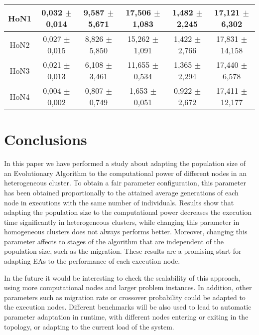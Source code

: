 \begin{table*}
\begin{tabular}{|c|c|c|c|c|c|}
HoN1	& 0,032	$\pm$ 0,014	& 9,587 $\pm$ 	5,671		& 17,506	$\pm$ 1,083		& 1,482	$\pm$ 2,245	&17,121  $\pm$ 	6,302 \\ \hline
HoN2	& 0,027	$\pm$ 0,015	& 8,826	$\pm$ 5,850			& 15,262	$\pm$ 1,091		& 1,422	$\pm$ 2,766	&17,831	 $\pm$ 14,158 \\ \hline
HoN3	& 0,021	$\pm$ 0,013	& 6,108	$\pm$ 3,461			& 11,655	$\pm$ 0,534		& 1,365	$\pm$ 2,294  &17,440  $\pm$ 	6,578 \\ \hline
HoN4	& 0,004	$\pm$ 0,002	& 0,807	$\pm$ 0,749			& 1,653		$\pm$ 0,051		& 0,922	$\pm$ 2,672	&17,411	 $\pm$ 12,177 \\ \hline
\end{tabular}
\label{tab:onemaxtimes}
\end{table*}

\section{Conclusions}
In this paper we have performed a study about adapting the
population size of an Evolutionary Algorithm to the computational
power of different nodes in an heterogeneous cluster. To obtain a fair parameter configuration,
this parameter has been obtained proportionally to the attained
average generations of each node in executions with the same number of
individuals. Results show that adapting the population size to the computational power decreases
the execution time significantly in heterogeneous clusters, while
changing this parameter in homogeneous clusters does not always
performs better. Moreover, changing this parameter affects to stages
of the algorithm that are independent of the population size, such as
the migration. These results are a promising start for adapting EAs to the
performance of each execution node. 

In the future it would be interesting to check the scalability of this
approach, using more computational nodes and larger problem
instances. In addition, other parameters such as migration rate or
crossover probability could be adapted to the execution
nodes. Different benchmarks will be also used to lead to automatic
parameter adaptation in runtime, with different nodes entering or
exiting in the topology, or adapting to the current load of the
system. 




